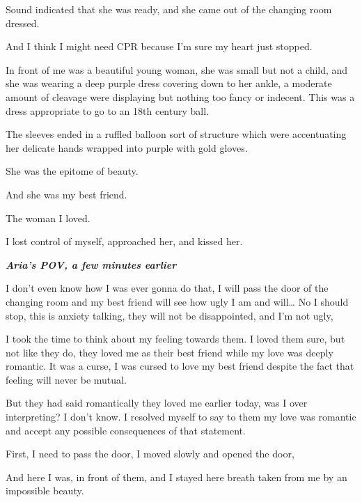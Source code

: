 \documentclass[colorlinks,12pt,a4paper]{book}
\begin{document}
 Sound indicated that she was ready, and she came out of the changing room dressed.\par
 \bigskip
 And I think I might need CPR because I'm sure my heart just stopped.\par
 \bigskip
 In front of me was a beautiful young woman, she was small but not a child, and she was wearing a deep purple dress 
 covering down to her ankle, a moderate amount of cleavage were displaying but nothing too fancy or indecent. 
 This was a dress appropriate to go to an 18th century ball. \par
 \bigskip
 The sleeves ended in a ruffled balloon sort of structure which were accentuating her delicate hands wrapped into purple
  with gold gloves.\par
  \bigskip
 
 She was the epitome of beauty.\par
 \bigskip
 
 And she was my best friend.\par
 \bigskip
 
 The woman I loved.\par
 \bigskip
 
 I lost control of myself, approached her, and kissed her.\par
 \bigskip
 
 \textit{\textbf{Aria's POV, a few minutes earlier}}\par
 \bigskip
 
 I don't even know how I was ever gonna do that, I will pass the door of the changing room and my best friend will see 
 how ugly I am and will…
 No I should stop, this is anxiety talking, they will not be disappointed, and I'm not ugly,\par
 \bigskip
 
 I took the time to think about my feeling towards them. I loved them sure, but not like they do, they loved me as their 
 best friend while my love was deeply romantic. It was a curse, I was cursed to love my best friend despite the fact that
  feeling will never be mutual.\par
  \bigskip
 
 But they had said romantically they loved me earlier today, was I over interpreting? I don't know. I resolved
  myself to say to them my love was romantic and accept any possible consequences of that statement. \par
  \bigskip
 
 First, I need to pass the door, I moved slowly and opened the door,\par
 \bigskip
 And here I was, in front of them, and I stayed here breath taken from me by an impossible beauty.\par
 \bigskip
 
\end{document}
